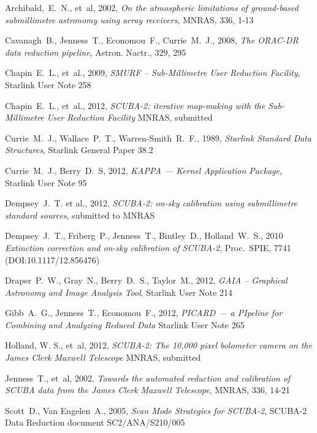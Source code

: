 \documentclass[twoside,11pt]{article}
\newcommand{\xref}[3]{#1}
\renewcommand{\_}{\texttt{\symbol{95}}}
\begin{document}
\begin{thebibliography}{}

Archibald,~E.~N., et~al, 2002, \textit{On the atmospheric limitations
of ground-based submillimetre astronomy using array receivers}, MNRAS,
336, 1-13

Cavanagh~B., Jenness~T., Economou~F., Currie~M.~J., 2008,
\textit{The ORAC-DR data reduction pipeline}, Astron. Nactr., 329, 295

Chapin~E.~L., et~al., 2009, \textit{SMURF -- Sub-Millimetre User Reduction
Facility},
\xref{Starlink User Note 258}{sun258}{}

Chapin~E.~L., et~al., 2012, \textit{SCUBA-2: iterative map-making with the
Sub-Millimetre User Reduction Facility} MNRAS, submitted

Currie~M.~J., Wallace~P.~T., Warren-Smith~R.~F., 1989,
\textit{Starlink Standard Data Structures}, \xref{Starlink General
Paper 38.2}{sgp38}{}

Currie~M.~J., Berry~D.~S, 2012, \textit{KAPPA --- Kernel Application Package},
\xref{Starlink User Note 95}{sun95}{}

Dempsey~J.~T. et al., 2012, \textit{SCUBA-2: on-sky calibration using
submillimetre standard sources}, submitted to MNRAS

Dempsey~J.~T., Friberg~P., Jenness~T., Bintley~D., Holland~W.~S., 2010
\textit{Extinction correction and on-sky calibration of SCUBA-2},
Proc.\ SPIE, 7741 (DOI:10.1117/12.856476)

Draper~P.~W., Gray~N., Berry~D.~S., Taylor~M., 2012,
\textit{GAIA -- Graphical Astronomy and Image Analysis Tool},
\xref{Starlink User Note 214}{sun214}{}

Gibb~A.~G., Jenness~T., Economou~F., 2012, \textit{PICARD --- a
PIpeline for Combining and Analyzing Reduced Data}
\xref{Starlink User Note 265}{sun265}{}

Holland, W. S., et~al, 2012, \textit{SCUBA-2: The 10,000 pixel bolometer
camera on the James Clerk Maxwell Telescope} MNRAS, submitted

Jenness~T., et~al, 2002, \textit{Towards the automated reduction and
calibration of SCUBA data from the James Clerk Maxwell Telescope},
MNRAS, 336, 14-21

Scott~D., Van Engelen~A., 2005, \textit{Scan Mode Strategies for
  SCUBA-2}, SCUBA-2 Data Reduction document SC2/ANA/S210/005

\end{thebibliography}
\end{document}
